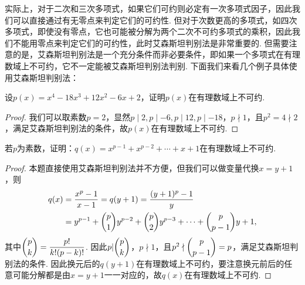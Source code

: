 实际上，对于二次和三次多项式，如果它们可约则必定有一次多项式因子，因此我们可以直接通过有无零点来判定它们的可约性. 但对于次数更高的多项式，如四次多项式，即使没有零点，它也可能被分解为两个二次不可约多项式的乘积，因此我们不能用零点来判定它们的可约性，此时艾森斯坦判别法是非常重要的. 但需要注意的是，艾森斯坦判别法是一个充分条件而非必要条件，即如果一个多项式在有理数域上不可约，它不一定能被艾森斯坦判别法判别. 下面我们来看几个例子具体使用艾森斯坦判别法：
\begin{example}
    设$p(x)=x^4-18x^3+12x^2-6x+2$，证明$p(x)$在有理数域上不可约.
\end{example}
\begin{proof}
    我们可以取素数$p=2$，显然$p\mid 2,p\mid -6,p\mid 12,p\mid -18$，$p\nmid 1$，且$p^2=4\nmid 2$，满足艾森斯坦判别法的条件，故$p(x)$在有理数域上不可约.
\end{proof}

\begin{example}
    若$p$为素数，证明：$q(x)=x^{p-1}+x^{p-2}+\cdots+x+1$在有理数域上不可约.
\end{example}
\begin{proof}
    本题直接使用艾森斯坦判别法并不方便，但我们可以做变量代换$x=y+1$，则
    \begin{align*}
        q(x)&=\dfrac{x^p-1}{x-1}=q(y+1)=\dfrac{(y+1)^p-1}{y} \\
        &=y^{p-1}+\dbinom{p}{1}y^{p-2}+\dbinom{p}{2}y^{p-3}+\cdots+\dbinom{p}{p-1}y+1,
    \end{align*}
    其中$\dbinom{p}{k}=\dfrac{p!}{k!(p-k)!}$. 因此$p|\dbinom{p}{k}$，$p\nmid 1$，且$p^2\nmid \dbinom{p}{p-1}=p$，满足艾森斯坦判别法的条件. 因此换元后的$q(y+1)$在有理数域上不可约，要注意换元前后的任意可能分解都是由$x=y+1$一一对应的，故$q(x)$在有理数域上不可约.
\end{proof}


